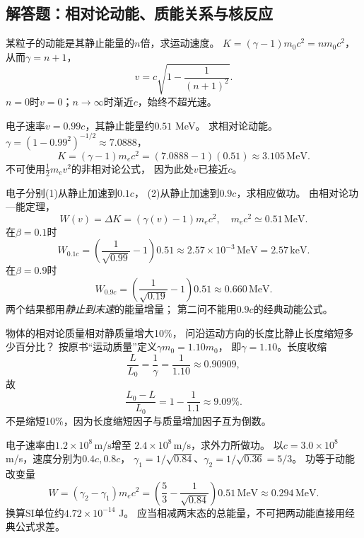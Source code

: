 \subsection{解答题：相对论动能、质能关系与核反应}

\problemtext 某粒子的动能是其静止能量的$n$倍，求运动速度。
\workings
$K=(\gamma-1)m_0c^2=nm_0c^2$，
从而$\gamma=n+1$，
\[
\boxed{v=c\sqrt{1-\frac1{(n+1)^2}}}.
\]
\crosscheck $n=0$时$v=0$；$n\to\infty$时渐近$c$，始终不超光速。

\problemtext 电子速率$v=0.99c$，其静止能量约$0.51$ MeV。
求相对论动能。
\workings
$\gamma=(1-0.99^2)^{-1/2}\approx7.0888$，
\[
\boxed{K=(\gamma-1)m_ec^2
=(7.0888-1)(0.51)
\approx3.105\,\mathrm{MeV}}.
\]
\crosscheck 不可使用$\frac12m_ev^2$的非相对论公式，
因为此处$v$已接近$c$。

\problemtext 电子分别(1)从静止加速到$0.1c$，
(2)从静止加速到$0.9c$，求相应做功。
\workings
由相对论功—能定理，
\[
W(v)=\Delta K=(\gamma(v)-1)m_ec^2,
\quad m_ec^2\simeq0.51\,\mathrm{MeV}.
\]
在$\beta=0.1$时
\[
\boxed{W_{0.1c}=
\left(\frac1{\sqrt{0.99}}-1\right)0.51
\approx2.57\times10^{-3}\,\mathrm{MeV}
=2.57\,\mathrm{keV}}.
\]
在$\beta=0.9$时
\[
\boxed{W_{0.9c}=
\left(\frac1{\sqrt{0.19}}-1\right)0.51
\approx0.660\,\mathrm{MeV}}.
\]
\crosscheck 两个结果都用\emph{静止到末速}的能量增量；
第二问不能用$0.9c$的经典动能公式。

\problemtext 物体的相对论质量相对静质量增大10\%，
问沿运动方向的长度比静止长度缩短多少百分比？
\workings
按原书“运动质量”定义$\gamma m_0=1.10m_0$，
即$\gamma=1.10$。长度收缩
\[
\frac{L}{L_0}=\frac1\gamma=\frac1{1.10}
\approx0.90909,
\]
故
\[
\boxed{\frac{L_0-L}{L_0}=1-\frac1{1.1}
\approx9.09\%}.
\]
\crosscheck 不是缩短10\%，因为长度缩短因子与质量增加因子互为倒数。

\problemtext 电子速率由$1.2\times10^8\,\mathrm{m/s}$增至
$2.4\times10^8\,\mathrm{m/s}$，求外力所做功。
\workings
以$c=3.0\times10^8$ m/s，速度分别为$0.4c,0.8c$，
$\gamma_1=1/\sqrt{0.84}$、$\gamma_2=1/\sqrt{0.36}=5/3$。
功等于动能改变量
\[
\boxed{W=(\gamma_2-\gamma_1)m_ec^2
=\left(\frac53-\frac1{\sqrt{0.84}}\right)0.51\,\mathrm{MeV}
\approx0.294\,\mathrm{MeV}}.
\]
换算SI单位约$4.72\times10^{-14}$ J。
\crosscheck 应当相减两末态的总能量，不可把两动能直接用经典公式求差。

